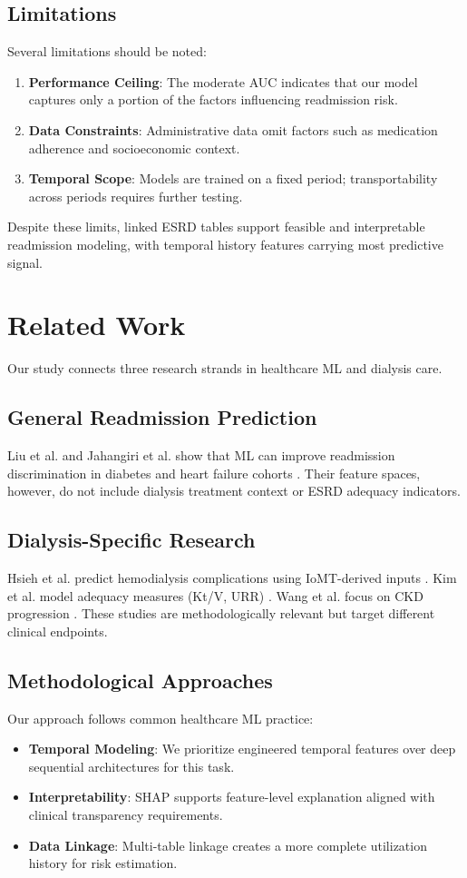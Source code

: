 \documentclass[conference]{IEEEtran}
\begin{document}
\subsection{Limitations}
Several limitations should be noted:
\begin{enumerate}
    \item \textbf{Performance Ceiling}: The moderate AUC indicates that our model captures only a portion of the factors influencing readmission risk.
    \item \textbf{Data Constraints}: Administrative data omit factors such as medication adherence and socioeconomic context.
    \item \textbf{Temporal Scope}: Models are trained on a fixed period; transportability across periods requires further testing.
\end{enumerate}

Despite these limits, linked ESRD tables support feasible and interpretable readmission modeling, with temporal history features carrying most predictive signal.

\section{Related Work}
Our study connects three research strands in healthcare ML and dialysis care.

\subsection{General Readmission Prediction}
Liu et al. and Jahangiri et al. show that ML can improve readmission discrimination in diabetes and heart failure cohorts \cite{liu2024machine,jahangiri2024predicting}. Their feature spaces, however, do not include dialysis treatment context or ESRD adequacy indicators.

\subsection{Dialysis-Specific Research}
Hsieh et al. predict hemodialysis complications using IoMT-derived inputs \cite{hsieh2023predicting}. Kim et al. model adequacy measures (Kt/V, URR) \cite{kim2021machine}. Wang et al. focus on CKD progression \cite{wang2025machine}. These studies are methodologically relevant but target different clinical endpoints.

\subsection{Methodological Approaches}
Our approach follows common healthcare ML practice:
\begin{itemize}
    \item \textbf{Temporal Modeling}: We prioritize engineered temporal features over deep sequential architectures for this task.
    \item \textbf{Interpretability}: SHAP supports feature-level explanation aligned with clinical transparency requirements.
    \item \textbf{Data Linkage}: Multi-table linkage creates a more complete utilization history for risk estimation.
\end{itemize}
\end{document}
